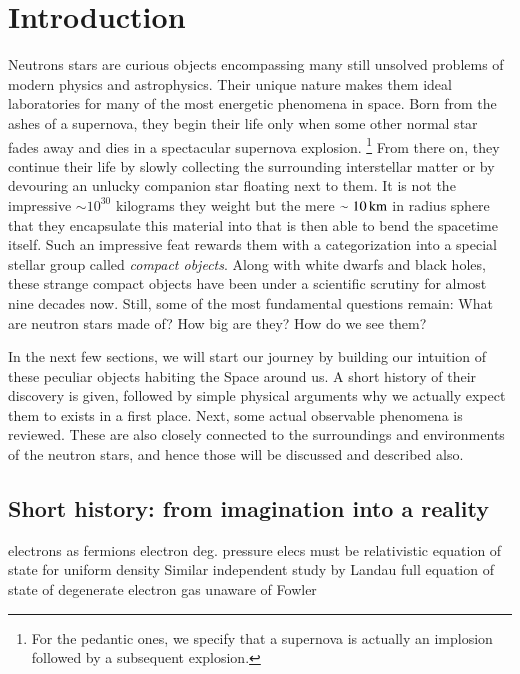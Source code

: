 \chapter{Introduction} 
Neutrons stars are curious objects encompassing many still unsolved problems of modern physics and astrophysics.
Their unique nature makes them ideal laboratories for many of the most energetic phenomena in space.
Born from the ashes of a supernova, they begin their life only when some other normal star fades away and dies in a spectacular supernova explosion.%
\footnote{ For the pedantic ones, we specify that a supernova is actually an implosion followed by a subsequent explosion.}
From there on, they continue their life by slowly collecting the surrounding interstellar matter or by devouring an unlucky companion star floating next to them.
It is not the impressive $\sim 10^{30}$ kilograms they weight but the mere $\sim 10 \, \mathrm{km}$ in radius sphere that they encapsulate this material into that is then able to bend the spacetime itself.
Such an impressive feat rewards them with a categorization into a special stellar group called \textit{compact objects}.
Along with white dwarfs and black holes, these strange compact objects have been under a scientific scrutiny for almost nine decades now.
Still, some of the most fundamental questions remain:
What are neutron stars made of?
How big are they?
How do we see them?

In the next few sections, we will start our journey by building our intuition of these peculiar objects habiting the Space around us.
A short history of their discovery is given, followed by simple physical arguments why we actually expect them to exists in a first place.
Next, some actual observable phenomena is reviewed.
These are also closely connected to the surroundings and environments of the neutron stars, and hence those will be discussed and described also.


\section{Short history: from imagination into a reality}

electrons as fermions\cite{Dirac25}
electron deg. pressure \cite{Fowler26}
elecs must be relativistic \cite{Anderson29}
equation of state for uniform density \cite{Stoner30}
Similar independent study by Landau \cite{Landau32}
full equation of state of degenerate electron gas unaware of Fowler \cite{Frenkel28} \cite{Yakovlev94}

